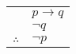 \documentclass{standalone}
\begin{document}
\begin{tabular}{rl}
    & $p \to q$  \\
    & $\lnot q$ \\
    \hline
    $\therefore$ & $\lnot p$
\end{tabular}
\end{document}
